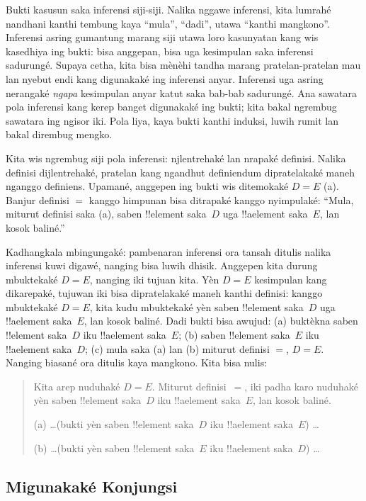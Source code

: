 \documentclass[../../../include/open-logic-section]{subfiles}
\begin{document}


Bukti kasusun saka inferensi siji-siji. Nalika nggawe inferensi,
kita lumrahé nandhani kanthi tembung kaya ``mula'', ``dadi'', utawa
``kanthi mangkono''. Inferensi asring gumantung marang siji utawa
loro kasunyatan kang wis kasedhiya ing bukti: bisa anggepan, bisa uga
kesimpulan saka inferensi sadurungé. Supaya cetha, kita bisa mènèhi
tandha marang pratelan-pratelan mau lan nyebut endi kang digunakaké
ing inferensi anyar. Inferensi uga asring nerangaké \emph{ngapa}
kesimpulan anyar katut saka bab-bab sadurungé. Ana sawatara pola
inferensi kang kerep banget digunakaké ing bukti; kita bakal
ngrembug sawatara ing ngisor iki. Pola liya, kaya bukti kanthi
induksi, luwih rumit lan bakal dirembug mengko.

Kita wis ngrembug siji pola inferensi: njlentrehaké lan nrapaké
definisi. Nalika definisi dijlentrehaké, pratelan kang ngandhut
definiendum dipratelakaké maneh nganggo definiens. Upamané, anggepen
ing bukti wis ditemokaké $D = E$ (a). Banjur definisi $=$ kanggo
himpunan bisa ditrapaké kanggo nyimpulaké: ``Mula, miturut
definisi saka (a), saben !!{element} saka~$D$ uga !!a{element}
saka~$E$, lan kosok baliné.''

Kadhangkala mbingungaké: pambenaran inferensi ora tansah ditulis
nalika inferensi kuwi digawé, nanging bisa luwih dhisik. Anggepen
kita durung mbuktekaké $D = E$, nanging iki tujuan kita. Yèn $D = E$
kesimpulan kang dikarepaké, tujuwan iki bisa dipratelakaké maneh
kanthi definisi: kanggo mbuktekaké $D = E$, kita kudu mbuktekaké
yèn saben !!{element} saka~$D$ uga !!a{element} saka~$E$, lan
kosok baliné. Dadi bukti bisa awujud: (a) buktèkna saben
!!{element} saka~$D$ iku !!a{element} saka~$E$; (b) saben
!!{element} saka~$E$ iku !!a{element} saka~$D$; (c) mula saka
(a) lan (b) miturut definisi $=$, $D = E$. Nanging biasané ora
ditulis kaya mangkono. Kita bisa nulis:
\begin{quote}
Kita arep nuduhaké $D = E$. Miturut definisi~$=$, iki padha karo
nuduhaké yèn saben !!{element} saka~$D$ iku !!a{element}
saka~$E$, lan kosok baliné.

(a) \dots (bukti yèn saben !!{element} saka~$D$ iku !!a{element}
saka~$E$) \dots

(b) \dots (bukti yèn saben !!{element}
saka~$E$ iku !!a{element} saka~$D$) \dots
\end{quote}

\subsection{Migunakaké Konjungsi}
\end{document}
